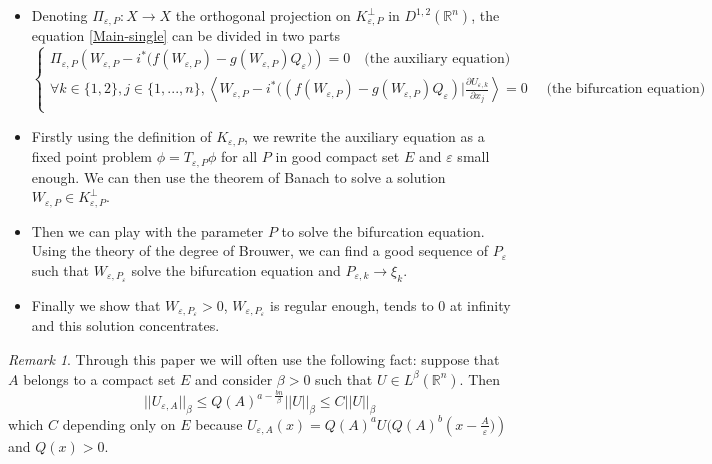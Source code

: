 \documentclass[12pt]{amsart}
\theoremstyle{plain}
\theoremstyle{definition}
\theoremstyle{remark}
\newtheorem{remark}[theorem]{Remark}
\renewcommand{\epsilon}{\varepsilon}
\begin{document}
\begin{itemize}
    \item Denoting $\Pi_{\epsilon,P}:X\rightarrow X$ the orthogonal projection on $K_{\epsilon,P}^\perp$ in $D^{1,2}(\mathbb{R}^n)$, the equation \eqref{Main-single} can be divided in two parts 
    \begin{equation*}\label{BVP2-R} 
  \begin{cases} 
\Pi_{\epsilon,P}(W_{\epsilon,P} - i^*\bigl(f(W_{\epsilon,P})-g(W_{\epsilon,P})Q_\epsilon\bigr))=0    \quad \text{(the auxiliary equation)} \\
     \forall k \in \{1,2\},j \in \{1,...,n\},\left\langle 
    W_{\epsilon,P} - i^*((f(W_{\epsilon,P})-g(W_{\epsilon,P})Q_\epsilon)| \frac{\partial U_{\epsilon,k}}{\partial x_j}\right\rangle=0\quad\text{ (the bifurcation equation)} \\
   \end{cases} 
    \end{equation*} 


\item Firstly using the definition of $K_{\epsilon,P}$, we rewrite the auxiliary equation as a fixed point problem $\phi=T_{\epsilon,P}\phi$  for all $P$ in good compact set $E$ and $\epsilon$ small enough. We can then use the theorem of Banach to solve a solution $W_{\epsilon,P} \in K_{\epsilon,P}^\perp$.
\item Then we can play with the parameter $P$ to solve the bifurcation equation. Using the theory of the degree of Brouwer, we can find a good sequence of $P_{\epsilon}$ such that $W_{\epsilon,P_{\epsilon}}$ solve the bifurcation equation and $P_{\epsilon,k}\rightarrow \xi_k$.

\item Finally we show that $W_{\epsilon,P_{\epsilon}}>0$, $W_{\epsilon,P_{\epsilon}}$ is regular enough, tends to $0$ at infinity and this solution concentrates.  


\end{itemize}

\bigskip


\begin{remark}
Through this paper we will often use the following fact: suppose that $A$ belongs to a compact set $E$ and consider $\beta >0$ such that $U \in L^{\beta}(\mathbb{R}^n)$. Then $$||U_{\epsilon,A}||_{\beta}\leq Q(A)^{a-\frac{bn}{\beta}}||U||_\beta\leq C||U||_\beta$$ which $C$ depending only on $E$ because $U_{\epsilon,A}(x)=Q(A)^aU(Q(A)^b\left(x-\frac{A}{\epsilon})\right)$ and $Q(x)>0$.
\end{remark}
\end{document}
